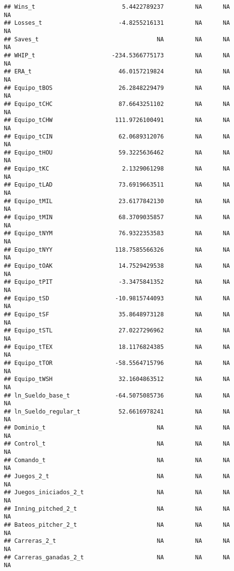 \documentclass[
]{article}
\begin{document}
\begin{verbatim}
## Wins_t                         5.4422789237         NA      NA       NA
## Losses_t                      -4.8255216131         NA      NA       NA
## Saves_t                                  NA         NA      NA       NA
## WHIP_t                      -234.5366775173         NA      NA       NA
## ERA_t                         46.0157219824         NA      NA       NA
## Equipo_tBOS                   26.2848229479         NA      NA       NA
## Equipo_tCHC                   87.6643251102         NA      NA       NA
## Equipo_tCHW                  111.9726100491         NA      NA       NA
## Equipo_tCIN                   62.0689312076         NA      NA       NA
## Equipo_tHOU                   59.3225636462         NA      NA       NA
## Equipo_tKC                     2.1329061298         NA      NA       NA
## Equipo_tLAD                   73.6919663511         NA      NA       NA
## Equipo_tMIL                   23.6177842130         NA      NA       NA
## Equipo_tMIN                   68.3709035857         NA      NA       NA
## Equipo_tNYM                   76.9322353583         NA      NA       NA
## Equipo_tNYY                  118.7585566326         NA      NA       NA
## Equipo_tOAK                   14.7529429538         NA      NA       NA
## Equipo_tPIT                   -3.3475841352         NA      NA       NA
## Equipo_tSD                   -10.9815744093         NA      NA       NA
## Equipo_tSF                    35.8648973128         NA      NA       NA
## Equipo_tSTL                   27.0227296962         NA      NA       NA
## Equipo_tTEX                   18.1176824385         NA      NA       NA
## Equipo_tTOR                  -58.5564715796         NA      NA       NA
## Equipo_tWSH                   32.1604863512         NA      NA       NA
## ln_Sueldo_base_t             -64.5075085736         NA      NA       NA
## ln_Sueldo_regular_t           52.6616978241         NA      NA       NA
## Dominio_t                                NA         NA      NA       NA
## Control_t                                NA         NA      NA       NA
## Comando_t                                NA         NA      NA       NA
## Juegos_2_t                               NA         NA      NA       NA
## Juegos_iniciados_2_t                     NA         NA      NA       NA
## Inning_pitched_2_t                       NA         NA      NA       NA
## Bateos_pitcher_2_t                       NA         NA      NA       NA
## Carreras_2_t                             NA         NA      NA       NA
## Carreras_ganadas_2_t                     NA         NA      NA       NA

\end{verbatim}
\end{document}
